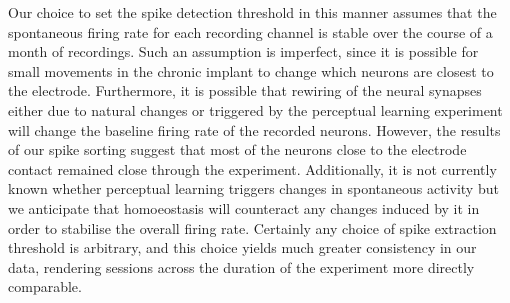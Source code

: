 Our choice to set the spike detection threshold in this manner assumes that the spontaneous firing rate for each recording channel is stable over the course of a month of recordings.
Such an assumption is imperfect, since it is possible for small movements in the chronic implant to change which neurons are closest to the electrode.
Furthermore, it is possible that rewiring of the neural synapses either due to natural changes or triggered by the perceptual learning experiment will change the baseline firing rate of the recorded neurons.
However, the results of our spike sorting suggest that most of the neurons close to the electrode contact remained close through the experiment.
Additionally, it is not currently known whether perceptual learning triggers changes in spontaneous activity but we anticipate that homoeostasis will counteract any changes induced by it in order to stabilise the overall firing rate.
Certainly any choice of spike extraction threshold is arbitrary, and this choice yields much greater consistency in our data, rendering sessions across the duration of the experiment more directly comparable.
